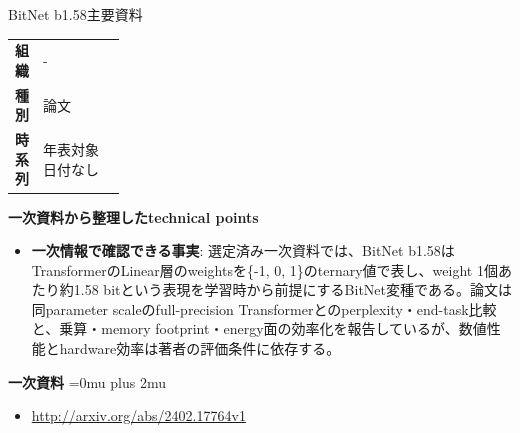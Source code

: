 \Needspace{0.38\textheight}
\begin{technicalnote}{BitNet b1.58}{主要資料}
\begingroup
\begin{tabularx}{\linewidth}{@{}>{\bfseries}p{0.22\linewidth}X@{}}
組織 & - \\
種別 & 論文 \\
時系列 & 年表対象日付なし \\
\end{tabularx}
\smallskip
\begin{minipage}{\linewidth}
{\bfseries 一次資料から整理したtechnical points}
\begin{itemize}[leftmargin=1.5em,itemsep=0.35em]
\item \textbf{一次情報で確認できる事実}: 選定済み一次資料では、BitNet b1.58はTransformerのLinear層のweightsを\{-1, 0, 1\}のternary値で表し、weight 1個あたり約1.58 bitという表現を学習時から前提にするBitNet変種である。論文は同parameter scaleのfull-precision Transformerとのperplexity・end-task比較と、乗算・memory footprint・energy面の効率化を報告しているが、数値性能とhardware効率は著者の評価条件に依存する。
\end{itemize}
\begin{minipage}{\linewidth}
\begin{samepage}
{\bfseries 一次資料}
\begingroup\sloppy
\Urlmuskip=0mu plus 2mu\relax
\begin{itemize}[leftmargin=1.5em,itemsep=0.25em]
\item {\scriptsize\url{http://arxiv.org/abs/2402.17764v1}}
\end{itemize}
\endgroup
\end{samepage}
\end{minipage}
\end{minipage}
\endgroup
\end{technicalnote}
\medskip

